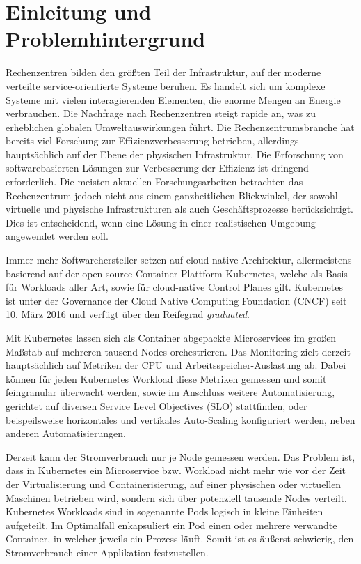 \chapter{Einleitung und Problemhintergrund}

Rechenzentren bilden den größten Teil der Infrastruktur, 
auf der moderne verteilte service-orientierte Systeme beruhen. 
Es handelt sich um komplexe Systeme mit vielen interagierenden Elementen, 
die enorme Mengen an Energie verbrauchen. Die Nachfrage nach Rechenzentren steigt rapide an, 
was zu erheblichen globalen Umweltauswirkungen führt. 
Die Rechenzentrumsbranche hat bereits viel Forschung zur Effizienzverbesserung betrieben, 
allerdings hauptsächlich auf der Ebene der physischen Infrastruktur. 
Die Erforschung von softwarebasierten Lösungen zur Verbesserung der Effizienz ist dringend erforderlich. 
Die meisten aktuellen Forschungsarbeiten betrachten das Rechenzentrum 
jedoch nicht aus einem ganzheitlichen Blickwinkel, der sowohl virtuelle und 
physische Infrastrukturen als auch Geschäftsprozesse berücksichtigt. 
Dies ist entscheidend, wenn eine Lösung in einer realistischen Umgebung angewendet werden soll.
\bigskip

Immer mehr Softwarehersteller setzen auf cloud-native Architektur,
allermeistens basierend auf der open-source Container-Plattform Kubernetes,
welche als Basis für Workloads aller Art, sowie für cloud-native Control Planes gilt.
Kubernetes ist unter der Governance der Cloud Native Computing Foundation (CNCF) seit 10. März 2016
und verfügt über den Reifegrad \emph{graduated}.
\bigskip

Mit Kubernetes lassen sich als Container abgepackte Microservices im großen Maßstab auf
mehreren tausend Nodes orchestrieren.
Das Monitoring zielt derzeit hauptsächlich auf Metriken der CPU und Arbeitsspeicher-Auslastung ab.
Dabei können für jeden Kubernetes Workload diese Metriken gemessen und somit feingranular überwacht werden,
sowie im Anschluss weitere Automatisierung, gerichtet auf diversen Service Level Objectives (SLO) stattfinden,
oder beispeilsweise horizontales und vertikales Auto-Scaling konfiguriert werden, neben anderen Automatisierungen.
\bigskip

Derzeit kann der Stromverbrauch nur je Node gemessen werden.
Das Problem ist, dass in Kubernetes ein Microservice bzw. Workload nicht mehr wie 
vor der Zeit der Virtualisierung und Containerisierung,
auf einer physischen oder virtuellen Maschinen betrieben wird,
sondern sich über potenziell tausende Nodes verteilt.
Kubernetes Workloads sind in sogenannte Pods logisch in kleine Einheiten aufgeteilt.
Im Optimalfall enkapsuliert ein Pod einen oder mehrere verwandte Container, in welcher jeweils ein Prozess läuft.
Somit ist es äußerst schwierig, den Stromverbrauch einer Applikation festzustellen.
\bigskip










